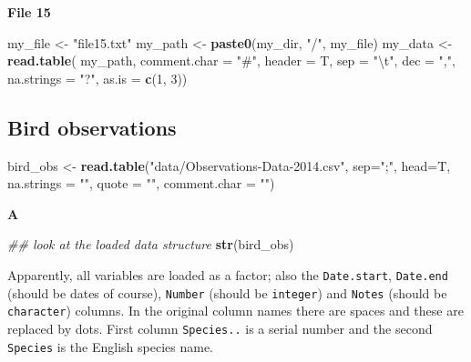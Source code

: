 \documentclass[]{book}
\newenvironment{Shaded}{\begin{snugshade}}{\end{snugshade}}
\newcommand{\CharTok}[1]{\textcolor[rgb]{0.31,0.60,0.02}{#1}}
\newcommand{\CommentTok}[1]{\textcolor[rgb]{0.56,0.35,0.01}{\textit{#1}}}
\newcommand{\DataTypeTok}[1]{\textcolor[rgb]{0.13,0.29,0.53}{#1}}
\newcommand{\DecValTok}[1]{\textcolor[rgb]{0.00,0.00,0.81}{#1}}
\newcommand{\KeywordTok}[1]{\textcolor[rgb]{0.13,0.29,0.53}{\textbf{#1}}}
\newcommand{\NormalTok}[1]{#1}
\newcommand{\StringTok}[1]{\textcolor[rgb]{0.31,0.60,0.02}{#1}}
\begin{document}
\textbf{File 15}

\begin{Shaded}
\begin{Highlighting}[]
\NormalTok{my_file <-}\StringTok{ "file15.txt"}
\NormalTok{my_path <-}\StringTok{ }\KeywordTok{paste0}\NormalTok{(my_dir, }\StringTok{"/"}\NormalTok{, my_file)}
\NormalTok{my_data <-}\StringTok{ }\KeywordTok{read.table}\NormalTok{(}
\NormalTok{    my_path,}
    \DataTypeTok{comment.char =} \StringTok{"#"}\NormalTok{,}
    \DataTypeTok{header =}\NormalTok{ T,}
    \DataTypeTok{sep =} \StringTok{"}\CharTok{\textbackslash{}t}\StringTok{"}\NormalTok{,}
    \DataTypeTok{dec =} \StringTok{","}\NormalTok{,}
    \DataTypeTok{na.strings =} \StringTok{"?"}\NormalTok{,}
    \DataTypeTok{as.is =} \KeywordTok{c}\NormalTok{(}\DecValTok{1}\NormalTok{, }\DecValTok{3}\NormalTok{))}
\end{Highlighting}
\end{Shaded}

\hypertarget{bird-observations-1}{%
\subsection{Bird observations}\label{bird-observations-1}}

\begin{Shaded}
\begin{Highlighting}[]
\NormalTok{bird_obs <-}\StringTok{ }\KeywordTok{read.table}\NormalTok{(}\StringTok{"data/Observations-Data-2014.csv"}\NormalTok{, }
                                             \DataTypeTok{sep=}\StringTok{";"}\NormalTok{, }
                                             \DataTypeTok{head=}\NormalTok{T, }
                                             \DataTypeTok{na.strings =} \StringTok{""}\NormalTok{, }
                                             \DataTypeTok{quote =} \StringTok{""}\NormalTok{, }
                                             \DataTypeTok{comment.char =} \StringTok{""}\NormalTok{)}
\end{Highlighting}
\end{Shaded}

\textbf{A}

\begin{Shaded}
\begin{Highlighting}[]
\CommentTok{## look at the loaded data structure}
\KeywordTok{str}\NormalTok{(bird_obs)}
\end{Highlighting}
\end{Shaded}

Apparently, all variables are loaded as a factor; also the \texttt{Date.start}, \texttt{Date.end} (should be dates of course), \texttt{Number} (should be \texttt{integer}) and \texttt{Notes} (should be \texttt{character}) columns. In the original column names there are spaces and these are replaced by dots. First column \texttt{Species..} is a serial number and the second \texttt{Species} is the English species name.
\end{document}
